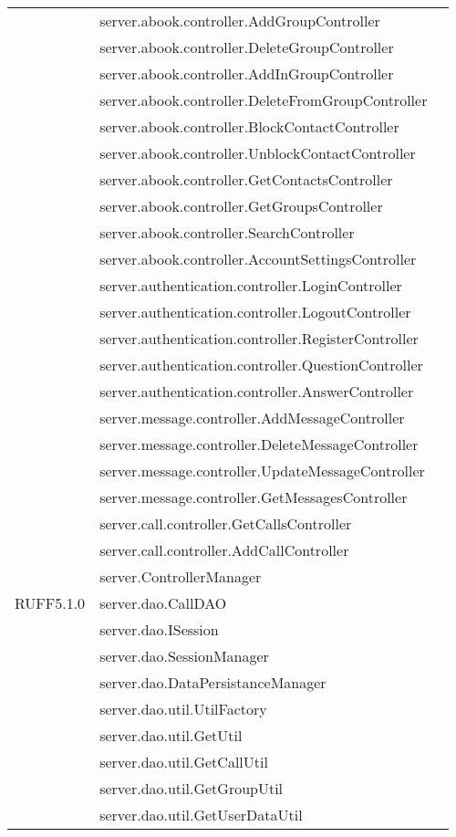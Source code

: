 \begin{center}
\begin{longtable}{lp{}l}
& server.abook.controller.AddGroupController\\
& server.abook.controller.DeleteGroupController\\
& server.abook.controller.AddInGroupController\\
& server.abook.controller.DeleteFromGroupController\\
& server.abook.controller.BlockContactController\\
& server.abook.controller.UnblockContactController\\
& server.abook.controller.GetContactsController\\
& server.abook.controller.GetGroupsController\\
& server.abook.controller.SearchController\\
& server.abook.controller.AccountSettingsController\\
& server.authentication.controller.LoginController\\
& server.authentication.controller.LogoutController\\
& server.authentication.controller.RegisterController\\
& server.authentication.controller.QuestionController\\
& server.authentication.controller.AnswerController\\
& server.message.controller.AddMessageController\\
& server.message.controller.DeleteMessageController\\
& server.message.controller.UpdateMessageController\\
& server.message.controller.GetMessagesController\\
& server.call.controller.GetCallsController\\
& server.call.controller.AddCallController\\
& server.ControllerManager\\
RUFF5.1.0 & server.dao.CallDAO\\
& server.dao.ISession\\
& server.dao.SessionManager\\
& server.dao.DataPersistanceManager\\
& server.dao.util.UtilFactory\\
& server.dao.util.GetUtil\\
& server.dao.util.GetCallUtil\\
& server.dao.util.GetGroupUtil\\
& server.dao.util.GetUserDataUtil\\

\end{longtable}
\end{center}
